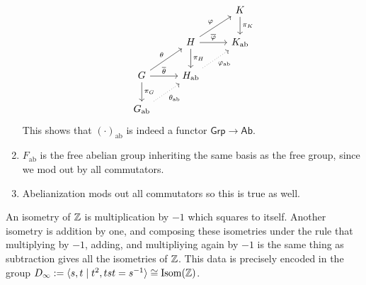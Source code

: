 \begin{ex}[Abelianization]
\begin{enumerate}[label=(\arabic*)]
\[\begin{tikzcd}
                                                                         &                                                                            & K \arrow[d, "\pi_K"] \\
                                                                         & H \arrow[d, "\pi_H"] \arrow[ru, "\varphi"] \arrow[r, "\overline{\varphi}"] & K_{\mathrm{ab}}      \\
G \arrow[d, "\pi_G"] \arrow[r, "\overline{\theta}"] \arrow[ru, "\theta"] & H_{\mathrm{ab}} \arrow[ru, "\varphi_{\mathrm{ab}}"', dotted]               &                      \\
G_{\mathrm{ab}} \arrow[ru, "\theta_{\mathrm{ab}}"', dotted]              &                                                                            &                     
\end{tikzcd}
\] This shows that $\left( \cdot  \right) _{\mathrm{ab}}$ is indeed a functor $\mathsf{Grp} \to \mathsf{Ab} $.
\item $F_{\mathrm{ab}}$ is the free abelian group inheriting the same basis as the free group, since we mod out by all commutators.
\item Abelianization mods out all commutators so this is true as well.
    \end{enumerate}
\end{ex}
\begin{ex}
    An isometry of $\mathbb{Z}$ is multiplication by $-1$ which squares to itself. Another isometry is addition by one, and composing these isometries under the rule that multiplying by $-1$, adding, and multipliying again by $-1$ is the same thing as subtraction gives all the isometries of $\mathbb{Z}$. This data is precisely encoded in the group $D_{\infty}:= \langle s,t \mid t^2,tst=s ^{-1} \rangle \cong \mathrm{Isom}(\mathbb{Z})$.
\end{ex}
